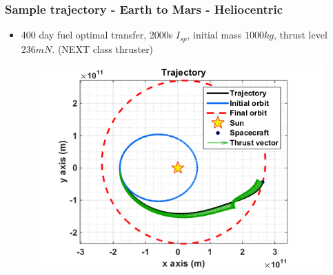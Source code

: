 \documentclass{beamer}
\begin{document}
\begin{frame}
\frametitle{Sample trajectory - Earth to Mars - Heliocentric}
\vspace{-2.50mm}
\begin{itemize}
	\item 400 day fuel optimal transfer, 2000s $I_{sp}$, initial mass $1000kg$, thrust level $236mN$. (NEXT class thruster)
\end{itemize}
\begin{figure}
	\vspace{-1.50mm}
	\centering\includegraphics[width=0.70\linewidth]{Imgs/Sample_Traj.png}
\end{figure}
\end{frame}

%			
%			

\end{document}
